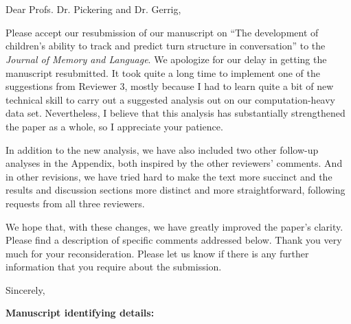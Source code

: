 \documentclass[11pt,a4paper]{letter} %
\def\opening#1{\thispagestyle{empty}
{\centering\fromaddress \vspace{0.6in} \\ %
\hspace*{\longindentation}\hspace*{\fill}\par} %
{\raggedright \toname \\ \toaddress \par} %
\vspace{0.4in} %
\noindent #1 %
}
\begin{document}

\begin{letter}{}


\opening{Dear Profs. Dr. Pickering and Dr. Gerrig,}

\smallskip

\noindent Please accept our resubmission of our manuscript on ``The development of children's ability to track and predict turn structure in conversation'' to the \textit{Journal of Memory and Language}. We apologize for our delay in getting the manuscript resubmitted. It took quite a long time to implement one of the suggestions from Reviewer 3, mostly because I had to learn quite a bit of new technical skill to carry out a suggested analysis out on our computation-heavy data set. Nevertheless, I believe that this analysis has substantially strengthened the paper as a whole, so I appreciate your patience. 

\noindent In addition to the new analysis, we have also included two other follow-up analyses in the Appendix, both inspired by the other reviewers' comments. And in other revisions, we have tried hard to make the text more succinct and the results and discussion sections more distinct and more straightforward, following requests from all three reviewers. 

\noindent We hope that, with these changes, we have greatly improved the paper's clarity. Please find a description of specific comments addressed below. Thank you very much for your reconsideration. Please let us know if there is any further information that you require about the submission.

\closing{Sincerely,}

\bigskip 
\bigskip 

\textbf{Manuscript identifying details:}


\end{letter}
\end{document}
